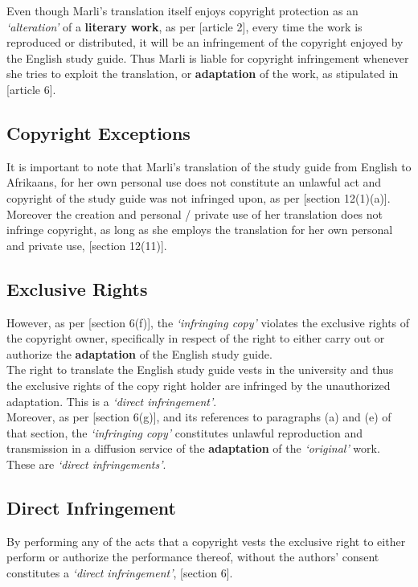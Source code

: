 \documentclass[11pt]{article}
\begin{document}
Even though Marli's translation itself enjoys copyright protection as
an \emph{`alteration'} of a \textbf{literary work}, as per [article
2]\cite{wipo86_berne}, every time the work is reproduced or distributed,
it will be an infringement of the copyright enjoyed by the English
study guide. Thus Marli is liable for copyright infringement whenever
she tries to exploit the translation, or \textbf{adaptation} of the work, as
stipulated in [article 6]\cite{wto17_trips}.

\subsection{Copyright Exceptions}
\label{sec:org42ff1b4}
It is important to note that Marli's translation of the study guide
from English to Afrikaans, for her own personal use does not
constitute an unlawful act and copyright of the study guide was not
infringed upon, as per [section 12(1)(a)]\cite{rsa78_copyrightact}.\\

Moreover the creation and personal / private use of her translation
does not infringe copyright, as long as she employs the translation
for her own personal and private use, [section
12(11)]\cite{rsa78_copyrightact}.

\subsection{Exclusive Rights}
\label{sec:org0828a32}

However, as per [section 6(f)]\cite{rsa78_copyrightact}, the
\emph{`infringing copy'} violates the exclusive rights of the copyright
owner, specifically in respect of the right to either carry out or
authorize the \textbf{adaptation} of the English study guide.\\

The right to translate the English study guide vests in the
university and thus the exclusive rights of the copy right holder are
infringed by the unauthorized adaptation. This is a \emph{`direct infringement'}.\\

Moreover, as per [section 6(g)]\cite{rsa78_copyrightact}, and its
references to paragraphs (a) and (e) of that section, the \emph{`infringing
copy'} constitutes unlawful reproduction and transmission in  a
diffusion service of the \textbf{adaptation} of the \emph{`original'} work. These
are \emph{`direct infringements'}.

\subsection{Direct Infringement}
\label{sec:orge2ce2f8}
By performing any of the acts that a copyright vests the exclusive
right to either perform or authorize the performance thereof, without
the authors' consent constitutes a \emph{`direct infringement'}, [section
6]\cite{rsa78_copyrightact}.
\end{document}
